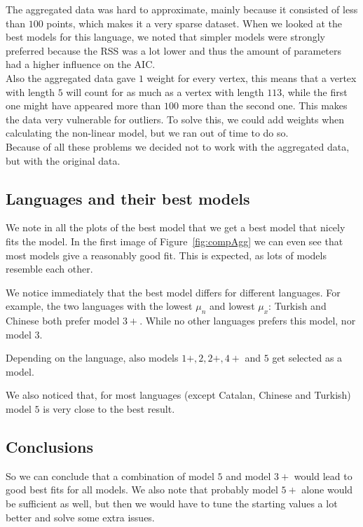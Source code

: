\documentclass[paper=a4, fontsize=11pt]{scrartcl} %
\begin{document}
The aggregated data was hard to approximate, mainly because it consisted of less than $100$ points, which makes it a very sparse dataset. When we looked at the best models for this language, we noted that simpler models were strongly preferred because the RSS was a lot lower and thus the amount of parameters had a higher influence on the AIC.\\

Also the aggregated data gave $1$ weight for every vertex, this means that a vertex with length $5$ will count for as much as a vertex with length $113$, while the first one might have appeared more than $100$ more than the second one. This makes the data very vulnerable for outliers. To solve this, we could add weights when calculating the non-linear model, but we ran out of time to do so.\\

Because of all these problems we decided not to work with the aggregated data, but with the original data.

\subsection{Languages and their best models}
We note in all the plots of the best model that we get a best model that nicely fits the model. In the first image of Figure~\ref{fig:compAgg} we can even see that most models give a reasonably good fit. This is expected, as lots of models resemble each other.

We notice immediately that the best model differs for different languages. For example, the two languages with the lowest $\mu_{n}$ and lowest $\mu_{x}$: Turkish and Chinese both prefer model $3+$. While no other languages prefers this model, nor model $3$.

Depending on the language, also models $1+,2,2+,4+$ and $5$ get selected as a model. 

We also noticed that, for most languages (except Catalan, Chinese and Turkish) model $5$ is very close to the best result.

\subsection{Conclusions}
So we can conclude that a combination of model $5$ and model $3+$ would lead to good best fits for all models. We also note that probably model $5+$ alone would be sufficient as well, but then we would have to tune the starting values a lot better and solve some extra issues.\\
\end{document}
